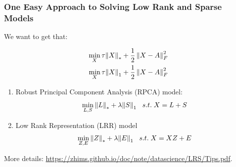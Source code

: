 \documentclass[aspectratio=2516]{beamer}
\begin{document}
\begin{frame}
\frametitle{\small One Easy Approach to Solving Low Rank and Sparse Models}

We want to get that:

\begin{equation}
\begin{split}
\small 
\mathop {\min }\limits_X \tau {\left\| X \right\|_*} & + \frac{1}{2}\left\| {X - A} \right\|_F^2\\
\mathop {\min }\limits_X \tau {\left\| X \right\|_1} & + \frac{1}{2}\left\| {X - A} \right\|_F^2
\end{split}
\end{equation}

\vspace{-0.25cm}

\begin{example}
	\begin{enumerate}
		\item \small Robust Principal Component Analysis (RPCA) model:
		\begin{equation}
		\small 
		\mathop {\min }\limits_{L,S} {\left\| L \right\|_*} + \lambda {\left\| S \right\|_1}\;\;\;s.t.\;X = L + S
		\label{eq6}
		\end{equation}
		\item \small Low Rank Representation (LRR) model
		\begin{equation}
		\small 
		\mathop {\min }\limits_{Z,E} {\left\| Z \right\|_*} + \lambda {\left\| E \right\|_1}\;\;\;s.t.\;X = XZ + E
		\label{eq7}
		\end{equation}
	\end{enumerate}
\end{example}

\vspace{-0.25cm}

{\tiny More details:} {\color{blue} \tiny \url{https://zhims.github.io/doc/note/datascience/LRS/Tips.pdf}}.

\end{frame}
\end{document}
